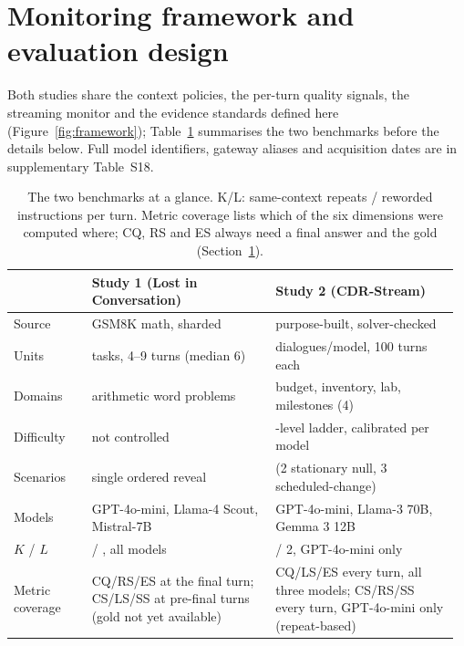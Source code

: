\section{Monitoring framework and evaluation design}
\label{sec:framework}

Both studies share the context policies, the per-turn quality signals, the
streaming monitor and the evidence standards defined here
(Figure~\ref{fig:framework}); Table~\ref{tab:datasets} summarises the two
benchmarks before the details below. Full model identifiers, gateway aliases
and acquisition dates are in supplementary Table~S18.

\begin{table}[!htbp]
\centering
\caption{The two benchmarks at a glance. K/L: same-context repeats / reworded
instructions per turn. Metric coverage lists which of the six dimensions were
computed where; CQ, RS and ES always need a final answer and the gold
(Section~\ref{sec:framework}).}
\label{tab:datasets}
\footnotesize
\setlength{\tabcolsep}{4pt}
\begin{tabular}{@{}>{\raggedright\arraybackslash}p{0.17\linewidth}
>{\raggedright\arraybackslash}p{0.40\linewidth}
>{\raggedright\arraybackslash}p{0.40\linewidth}@{}}
\toprule
 & Study 1 (Lost in Conversation) & Study 2 (CDR-Stream)\\
\midrule
Source & GSM8K math, sharded \citep{cobbe2021training,laban2025lost} &
purpose-built, solver-checked\\
Units & \nTasks{} tasks, 4--9 turns (median 6) & 30 dialogues/model, 100 turns
each\\
Domains & arithmetic word problems & budget, inventory, lab, milestones (4)\\
Difficulty & not controlled & 12-level ladder, calibrated per model\\
Scenarios & single ordered reveal & 5 (2 stationary null, 3 scheduled-change)\\
Models & GPT-4o-mini, Llama-4 Scout, Mistral-7B & GPT-4o-mini, Llama-3 70B,
Gemma 3 12B\\
$K$ / $L$ & \Krep{} / \Lpar{}, all models & 3 / 2, GPT-4o-mini only\\
Metric coverage & CQ/RS/ES at the final turn; CS/LS/SS at pre-final turns
(gold not yet available) & CQ/LS/ES every turn, all three models; CS/RS/SS
every turn, GPT-4o-mini only (repeat-based)\\
\bottomrule
\end{tabular}
\end{table}

